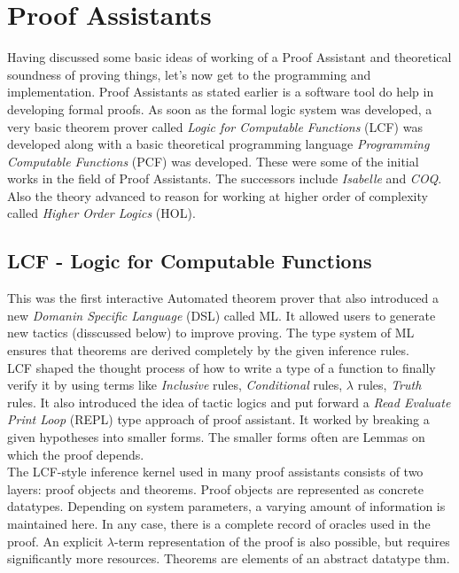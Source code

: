 \chapter{Proof Assistants }
Having discussed some basic ideas of working of a Proof Assistant and theoretical soundness of proving things, let's now get to the programming and implementation. Proof Assistants as stated earlier is a software tool do help in developing formal proofs. As soon as the formal logic system was developed, a very basic theorem prover called  \textit{Logic for Computable Functions} (LCF) was developed along with a basic theoretical programming language \textit{Programming Computable Functions} (PCF) was developed. These were some of the initial works in the field of Proof Assistants. The successors include \textit{Isabelle} and \textit{COQ}. Also the theory advanced to reason for working at higher order of complexity called \textit{Higher Order Logics} (HOL).  


\section{LCF - Logic for Computable Functions}
This was the first interactive Automated theorem prover that also introduced a new \textit{Domanin Specific Language} (DSL) called ML. It allowed users to generate new tactics (disscussed below) to improve proving. The type system of ML ensures that theorems are derived completely by the given inference rules. \\

LCF shaped the thought process of how to write a type of a function to finally verify it by using terms like \textit{Inclusive} rules, \textit{Conditional} rules, \textit{$\lambda$} rules, \textit{Truth} rules. It also introduced the idea of tactic logics and put forward a \textit{Read Evaluate Print Loop} (REPL) type approach of proof assistant. It worked by breaking a given hypotheses into smaller forms. The smaller forms often are Lemmas on which the proof depends.\\

The  LCF-style  inference  kernel used in many proof assistants consists  of two layers: proof objects and theorems. Proof objects are represented as concrete datatypes. Depending on system parameters, a varying amount of information is maintained here. In any case, there is a complete record of oracles used in the proof. An explicit $\lambda$-term representation of the proof is also possible, but requires significantly more resources. Theorems are elements of an abstract datatype thm.\\

